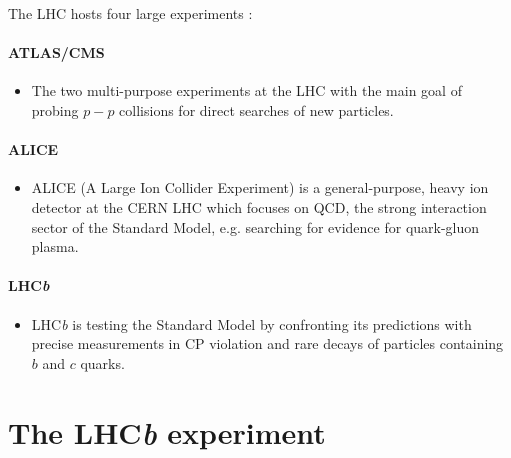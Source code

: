 \documentclass[11pt]{scrreprt}
\begin{document}
The LHC hosts four large experiments \parencite{Aad2008,Aamodt2008,AlvesJr2008,Collaboration2008}:

\paragraph{ATLAS/CMS}
  \begin{itemize}
    \item The two multi-purpose experiments at the LHC with the main goal of probing $p-p$ collisions for direct searches of new particles.
  \end{itemize}
\paragraph{ALICE}
  \begin{itemize}
    \item ALICE (A Large Ion Collider Experiment) is a general-purpose, heavy ion detector at the CERN LHC
    which focuses on QCD, the strong interaction sector of the Standard Model, e.g. searching for evidence for quark-gluon
    plasma.
  \end{itemize}
\paragraph{LHC\textit{b}}
  \begin{itemize}
    \item LHC\textit{b} is testing the Standard Model by confronting its predictions with precise measurements in CP
    violation and rare decays of particles containing $b$ and $c$ quarks.
  \end{itemize}




\section{The LHC\textit{b} experiment}
\end{document}
